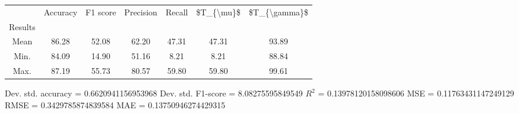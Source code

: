 \begin{tabular}{|c|c|c|c|c|c|c|}
\toprule
{} &  Accuracy &  F1 score &  Precision &  Recall &  \$T\_\{\textbackslash mu\}\$ &  \$T\_\{\textbackslash gamma\}\$ \\
Results &           &           &            &         &            &               \\
\hline
Mean    &     86.28 &     52.08 &      62.20 &   47.31 &      47.31 &         93.89 \\
Min.    &     84.09 &     14.90 &      51.16 &    8.21 &       8.21 &         88.84 \\
Max.    &     87.19 &     55.73 &      80.57 &   59.80 &      59.80 &         99.61 \\
\bottomrule
\end{tabular}

 Dev. std. accuracy = 0.6620941156953968
 Dev. std. F1-score = 8.08275595849549
 $R^2$ = 0.13978120158098606
 MSE = 0.11763431147249129
 RMSE = 0.3429785874839584
 MAE = 0.13750946274429315